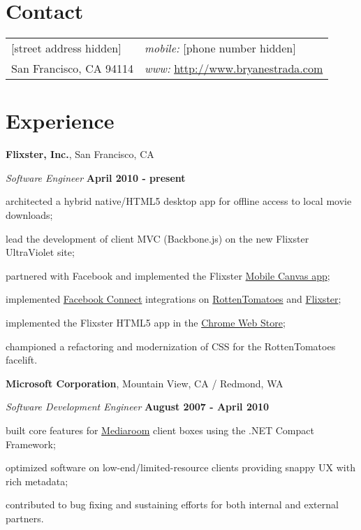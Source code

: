 \documentclass[margin,line]{res}
\newenvironment{list1}{
  \begin{list}{\ding{113}}{%
      \setlength{\itemsep}{0in}
      \setlength{\parsep}{0in} \setlength{\parskip}{0in}
      \setlength{\topsep}{0in} \setlength{\partopsep}{0in} 
      \setlength{\leftmargin}{0.17in}}}{\end{list}}
\begin{document}

\begin{resume}
\section{\sc \large Contact}
\vspace{.05in}
\begin{tabular}{@{}p{2in}p{4in}}
[street address hidden]    & {\it mobile:} [phone number hidden] \\            
San Francisco, CA 94114    & {\it www:} \url{http://www.bryanestrada.com} \\         
\end{tabular}


\section{\sc \large Experience}
{\bf Flixster, Inc.}, San Francisco, CA

\vspace{-.3cm}
{\em Software Engineer} \hfill {\small \bf April 2010 - present}
\begin{list1}
\item[] architected a hybrid native/HTML5 desktop app for offline access to local movie downloads;
\item[] lead the development of client MVC (Backbone.js) on the new Flixster UltraViolet site;
\item[] partnered with Facebook and implemented the Flixster \href{http://www.facebookmobileweb.com/showcase/}{Mobile Canvas app};
\item[] implemented \href{http://www.facebook.com/instantpersonalization/}{Facebook Connect} integrations on \href{http://www.rottentomatoes.com/}{RottenTomatoes} and \href{http://www.flixster.com/}{Flixster};
\item[] implemented the Flixster HTML5 app in the \href{https://chrome.google.com/webstore/detail/hgbpjlnkjhllfgfdmieompodgaefjcfh}{Chrome Web Store};
\item[] championed a refactoring and modernization of CSS for the RottenTomatoes facelift.
\end{list1}

{\bf Microsoft Corporation}, Mountain View, CA / Redmond, WA

\vspace{-.3cm}
{\em Software Development Engineer} \hfill {\small \bf August 2007 - April 2010}
\begin{list1}
\item[] built core features for \href{http://www.microsoftmediaroom.com/}{Mediaroom} client boxes using the .NET Compact Framework;
\item[] optimized software on low-end/limited-resource clients providing snappy UX with rich metadata;
\item[] contributed to bug fixing and sustaining efforts for both internal and external partners.
\end{list1}


\end{resume}
\end{document}
